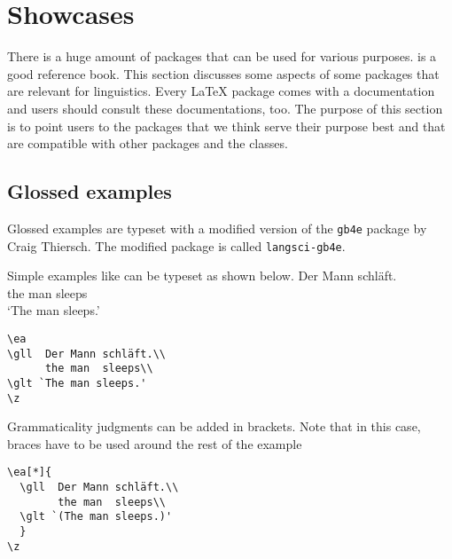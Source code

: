 \chapter{Showcases}

There is a huge amount of packages that can be used for various purposes. \citet{MG2013a} is a good
reference book. This section discusses some aspects of some packages that are relevant for
linguistics. Every \LaTeX\xspace package comes with a documentation and users should consult these
documentations, too. The purpose of this section is to point users to the packages that we think
serve their purpose best and that are compatible with other packages and the \lsp classes.

\section{Glossed examples}

Glossed examples are typeset with a modified version of the \texttt{gb4e} package by Craig
Thiersch. The modified package is called \texttt{langsci-gb4e}. 

Simple examples like  can be typeset as shown below.
\ea\label{ex:showcases:simple} 
\gll Der Mann schläft.\\
     the man  sleeps\\
\glt `The man sleeps.'
\z
\begin{verbatim}
\ea
\gll  Der Mann schläft.\\
      the man  sleeps\\
\glt `The man sleeps.'
\z
\end{verbatim}

Grammaticality judgments can be added in brackets. Note that in this case, braces have to be used around the rest of the example
\z
 
\newpage
\begin{verbatim}
\ea[*]{
  \gll  Der Mann schläft.\\
        the man  sleeps\\
  \glt `(The man sleeps.)'
  }
\z
\end{verbatim} 


